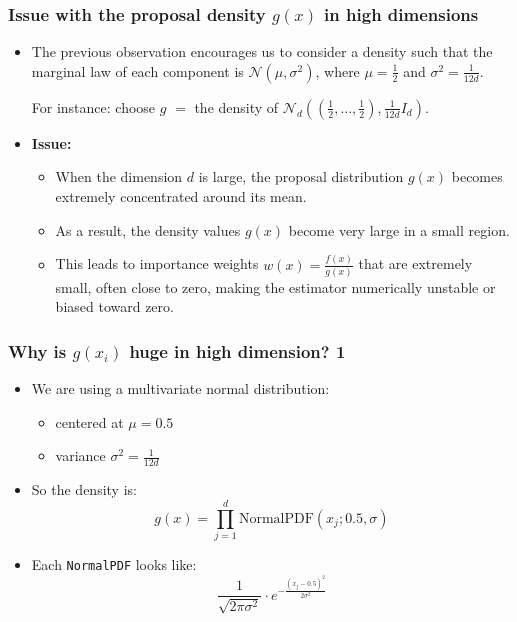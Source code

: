 \documentclass[aspectratio=169,xcolor=dvipsnames]{beamer}
\begin{document}
    \begin{frame}
    \frametitle{Issue with the proposal density $g(x)$ in high dimensions}
        \begin{itemize}
            \item<1-> The previous observation encourages us to consider a density such that the marginal law of each component is $\mathcal{N}(\mu, \sigma^2)$, where $\mu = \frac{1}{2}$ and $\sigma^2 = \frac{1}{12d}$.

            For instance: choose $g$ $=$ the density of $\mathcal{N}_d\left(\left(\frac{1}{2}, \dots, \frac{1}{2}\right), \frac{1}{12d} I_d\right)$.

            \item<2-> \textbf{Issue:}
            \begin{itemize}
                \item<2-> When the dimension $d$ is large, the proposal distribution $g(x)$ becomes extremely concentrated around its mean.
                
                \item<3-> As a result, the density values $g(x)$ become very large in a small region.
                    
                \item<4-> This leads to importance weights $w(x) = \frac{f(x)}{g(x)}$ that are extremely small, often close to zero, making the estimator numerically unstable or biased toward zero.
            \end{itemize}
        \end{itemize}
    \end{frame}






    \begin{frame}
        \frametitle{Why is $g(x_i)$ huge in high dimension? 1}
        
        \begin{itemize}
            \item<1->We are using a multivariate normal distribution:
                \begin{itemize}
                  \item centered at $\mu = 0.5$
                  \item variance $\sigma^2 = \frac{1}{12d}$
                \end{itemize}
        
            \item<2->So the density is:
            \[
            g(x) = \prod_{j=1}^d \text{NormalPDF}(x_j ; 0.5, \sigma)
            \]
            
            \item<3->Each \texttt{NormalPDF} looks like:
            \[
            \frac{1}{\sqrt{2\pi \sigma^2}} \cdot e^{-\frac{(x_j - 0.5)^2}{2\sigma^2}}
            \]
        \end{itemize}
    \end{frame}
\end{document}
